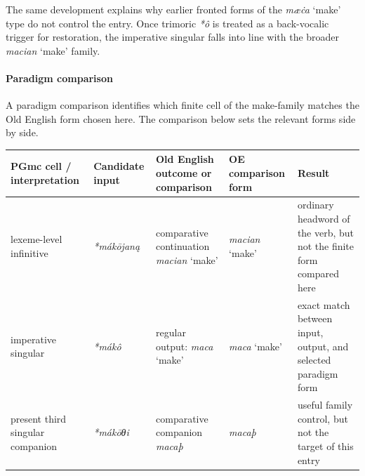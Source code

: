 \documentclass[
  british,
  a4paper,
]{article}
\newcounter{none} %
\begin{document}
The same development explains why earlier fronted forms of the
\emph{mæċa} `make' type do not control the entry. Once trimoric
\emph{*ô} is treated as a back-vocalic trigger for restoration, the
imperative singular falls into line with the broader \emph{macian}
`make' family.

\paragraph{Paradigm comparison}\label{paradigm-comparison-14}

A paradigm comparison identifies which finite cell of the make-family
matches the Old English form chosen here. The comparison below sets the
relevant forms side by side.

{\def\LTcaptype{none} %
\begin{longtable}[]{@{}
  >{\raggedright\arraybackslash}p{}
  >{\raggedright\arraybackslash}p{}
  >{\raggedright\arraybackslash}p{}
  >{\raggedright\arraybackslash}p{}
  >{\raggedright\arraybackslash}p{}@{}}
\toprule\noalign{}
\begin{minipage}[b]{\linewidth}\raggedright
PGmc cell / interpretation
\end{minipage} & \begin{minipage}[b]{\linewidth}\raggedright
Candidate input
\end{minipage} & \begin{minipage}[b]{\linewidth}\raggedright
Old English outcome or comparison
\end{minipage} & \begin{minipage}[b]{\linewidth}\raggedright
OE comparison form
\end{minipage} & \begin{minipage}[b]{\linewidth}\raggedright
Result
\end{minipage} \\
\midrule\noalign{}
\endhead
\bottomrule\noalign{}
\endlastfoot
lexeme-level infinitive & {\emph{*mákōjaną}} & comparative continuation
{\emph{macian}} `make' & {\emph{macian}} `make' & ordinary headword of
the verb, but not the finite form compared here \\
imperative singular & {\emph{*mákô}} & regular output: {\emph{maca}}
`make' & {\emph{maca}} `make' & exact match between input, output, and
selected paradigm form \\
present third singular companion & {\emph{*mákōθi}} & comparative
companion {\emph{macaþ}} & {\emph{macaþ}} & useful family control, but
not the target of this entry \\
\end{longtable}
}
\end{document}
